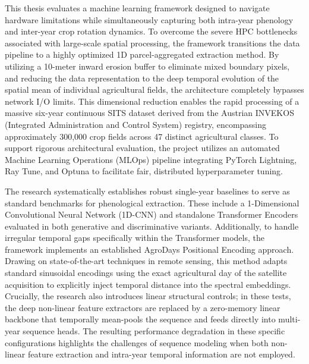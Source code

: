 This thesis evaluates a machine learning framework designed to navigate hardware limitations while
simultaneously capturing both intra-year phenology and inter-year crop rotation dynamics.
To overcome the severe HPC bottlenecks associated with large-scale spatial processing,
the framework transitions the data pipeline to a highly optimized 1D parcel-aggregated extraction method.
By utilizing a 10-meter inward erosion buffer to eliminate mixed boundary pixels,
and reducing the data representation to the deep temporal evolution of the spatial mean of
individual agricultural fields, the architecture completely bypasses network I/O limits.
This dimensional reduction enables the rapid processing of a massive six-year continuous SITS
dataset derived from the Austrian INVEKOS (Integrated Administration and Control System) registry,
encompassing approximately 300,000 crop fields across 47 distinct agricultural classes.
To support rigorous architectural evaluation, the project utilizes an automated Machine
Learning Operations (MLOps) pipeline integrating PyTorch Lightning, Ray Tune, and Optuna
to facilitate fair, distributed hyperparameter tuning.

The research systematically establishes robust single-year baselines to serve as standard
benchmarks for phenological extraction.
These include a 1-Dimensional Convolutional Neural Network (1D-CNN) and standalone Transformer
Encoders evaluated in both generative and discriminative variants.
Additionally, to handle irregular temporal gaps specifically within the Transformer models,
the framework implements an established AgroDays Positional Encoding approach.
Drawing on state-of-the-art techniques in remote sensing, this method adapts standard sinusoidal
encodings using the exact agricultural day of the satellite acquisition to explicitly inject temporal
distance into the spectral embeddings.
Crucially, the research also introduces linear structural controls; in these tests,
the deep non-linear feature extractors are replaced by a zero-memory linear backbone that
temporally mean-pools the sequence and feeds directly into multi-year sequence heads.
The resulting performance degradation in these specific configurations highlights the challenges of
sequence modeling when both non-linear feature extraction and intra-year temporal information are not employed.

